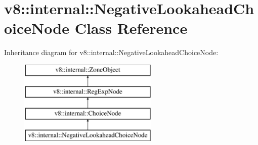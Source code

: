 \hypertarget{classv8_1_1internal_1_1_negative_lookahead_choice_node}{}\section{v8\+:\+:internal\+:\+:Negative\+Lookahead\+Choice\+Node Class Reference}
\label{classv8_1_1internal_1_1_negative_lookahead_choice_node}
Inheritance diagram for v8\+:\+:internal\+:\+:Negative\+Lookahead\+Choice\+Node\+:\begin{figure}[H]
\begin{center}
\leavevmode
\includegraphics[height=4.000000cm]{classv8_1_1internal_1_1_negative_lookahead_choice_node}
\end{center}
\end{figure}
